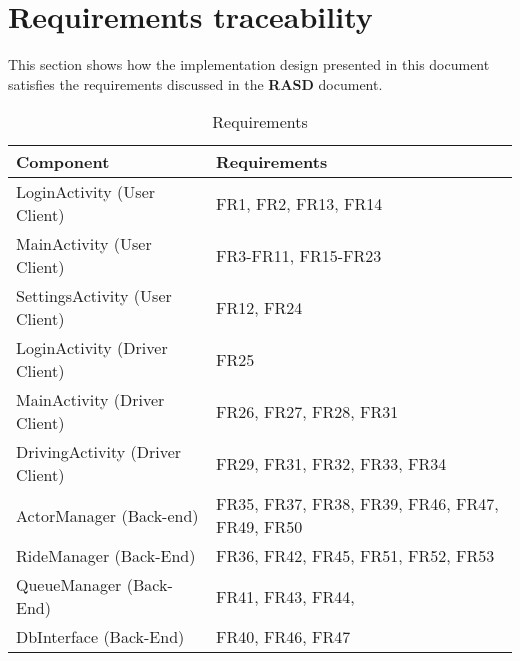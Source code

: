 \section{Requirements traceability} %
\label{sec:requirements-traceability}
This section shows how the implementation design presented in this document satisfies the requirements discussed in the \textbf{RASD} document.\\


\begin{table}[!h]
\centering
\caption{Requirements}
\begin{tabular}{|l|l|}
\hline
\textbf{Component}              & \textbf{Requirements}                          \\ \hline
LoginActivity (User Client)     & FR1,  FR2, FR13, FR14                          \\ \hline
MainActivity (User Client)      & FR3-FR11, FR15-FR23                            \\ \hline
SettingsActivity (User Client)  & FR12, FR24                                     \\ \hline
LoginActivity (Driver Client)   & FR25                                           \\ \hline
MainActivity (Driver Client)    & FR26, FR27, FR28, FR31                         \\ \hline
DrivingActivity (Driver Client) & FR29, FR31, FR32, FR33, FR34                   \\ \hline
ActorManager (Back-end)         & FR35, FR37, FR38, FR39, FR46, FR47, FR49, FR50 \\ \hline
RideManager (Back-End)          & FR36, FR42, FR45, FR51, FR52, FR53             \\ \hline
QueueManager (Back-End)         & FR41, FR43, FR44,                              \\ \hline
DbInterface (Back-End)          & FR40, FR46, FR47                               \\ \hline
\end{tabular}
\end{table}

